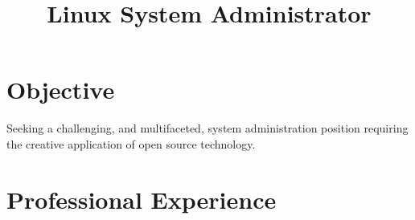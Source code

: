 \documentclass[11pt,letterpaper,sans]{moderncv}
\title{Linux System Administrator}
\begin{document}
\makecvtitle

\section{Objective}

Seeking a challenging, and multifaceted, system administration position 
requiring the creative application of open source technology.


\section{Professional Experience}
\end{document}
